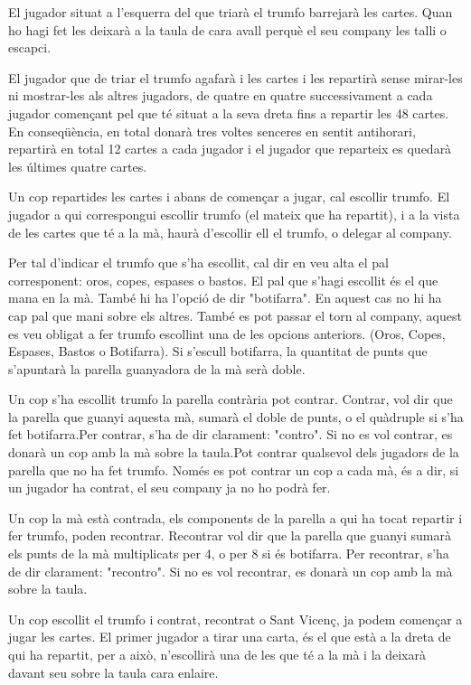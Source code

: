 El jugador situat a l'esquerra del que triarà el trumfo barrejarà les cartes. Quan ho hagi fet les deixarà a la taula de cara avall perquè el seu company les talli o escapci.


El jugador que de triar el trumfo agafarà i les cartes i les repartirà sense mirar-les ni mostrar-les als altres jugadors, de quatre en quatre successivament a cada jugador començant pel que té situat a la seva dreta fins a repartir les 48 cartes. En conseqüència, en total donarà tres voltes senceres en sentit antihorari, repartirà en total 12 cartes a cada jugador i el jugador que reparteix es quedarà les últimes quatre cartes.


Un cop repartides les cartes i abans de començar a jugar, cal escollir trumfo. El jugador a qui correspongui escollir trumfo (el mateix que ha repartit), i a la vista de les cartes que té a la mà, haurà d'escollir ell el trumfo, o delegar al company.

Per tal d'indicar el trumfo que s'ha escollit, cal dir en veu alta el pal corresponent: oros, copes, espases o bastos. El pal que s'hagi escollit és el que mana en la mà. També hi ha l'opció de dir "botifarra". En aquest cas no hi ha cap pal que mani sobre els altres. També es pot passar el torn al company, aquest es veu obligat a fer trumfo escollint una de les opcions anteriors. (Oros, Copes, Espases, Bastos o Botifarra). Si s'escull botifarra, la quantitat de punts que s'apuntarà la parella guanyadora de la mà serà doble.

Un cop s'ha escollit trumfo la parella contrària pot contrar. Contrar, vol dir que la parella que guanyi aquesta mà, sumarà el doble de punts, o el quàdruple si s'ha fet botifarra.Per contrar, s'ha de dir clarament: "contro". Si no es vol contrar, es donarà un cop amb la mà sobre la taula.Pot contrar qualsevol dels jugadors de la parella que no ha fet trumfo. Només es pot contrar un cop a cada mà, és a dir, si un jugador ha contrat, el seu company ja no ho podrà fer.

Un cop la mà està contrada, els components de la parella a qui ha tocat repartir i fer trumfo, poden recontrar. Recontrar vol dir que la parella que guanyi sumarà els punts de la mà multiplicats per 4, o per 8 si és botifarra. Per recontrar, s'ha de dir clarament: "recontro". Si no es vol recontrar, es donarà un cop amb la mà sobre la taula.



Un cop escollit el trumfo i contrat, recontrat o Sant Vicenç, ja podem començar a jugar les cartes. El primer jugador a tirar una carta, és el que està a la dreta de qui ha repartit, per a això, n'escollirà una de les que té a la mà i la deixarà davant seu sobre la taula cara enlaire.

